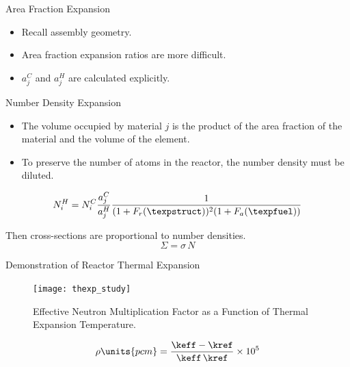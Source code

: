 \begin{frame}{Area Fraction Expansion}
  \begin{itemize}
    \item Recall assembly geometry.
    \item Area fraction expansion ratios are more difficult.
    \item $a_j^C$ and $a_j^H$ are calculated explicitly.
  \end{itemize}

  \begin{figure}
    \centering
    \hspace{0.2in}
    \label{fig:assy_geometry}
  \end{figure}
\end{frame}

\begin{frame}{Number Density Expansion}
  \begin{itemize}
    \item The volume occupied by material $j$ is the product of the 
      area fraction of the material and the volume of the element.
    \item To preserve the number of atoms in the reactor, the number density 
      must be diluted.
  \end{itemize}
  \begin{equation}
    \label{eq:nden_thexp_update}
    N_i^H = N_i^C \frac{a_j^C}{a_j^H} 
      \frac{1}{(1+F_r(\texpstruct))^2 (1+F_a(\texpfuel))}
  \end{equation}

  Then cross-sections are proportional to number densities.
  \begin{equation}
    \Sigma = \sigma \, N
  \end{equation}
\end{frame}

\begin{frame}{Demonstration of Reactor Thermal Expansion}
  \begin{figure}
    \centering
    \texttt{[image: thexp\_study]}
    \caption{Effective Neutron Multiplication Factor as a Function of 
      Thermal Expansion Temperature.}
    \label{fig:thexp_study}
  \end{figure}
  \begin{equation}
    \label{eq:reactivity_formula}
    \rho \units{pcm} = \frac{\keff - \kref}{\keff \, \kref} \times 10^5
  \end{equation}
\end{frame}

